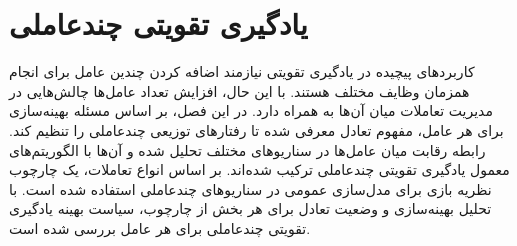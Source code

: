 \chapter{یادگیری تقویتی چندعاملی}
کاربردهای پیچیده در یادگیری تقویتی نیازمند اضافه کردن چندین عامل برای انجام همزمان وظایف مختلف هستند.
با این حال، افزایش تعداد عامل‌ها چالش‌هایی در مدیریت تعاملات میان آن‌ها به همراه دارد.
در این فصل، بر اساس مسئله بهینه‌سازی برای هر عامل، مفهوم تعادل معرفی شده تا رفتارهای توزیعی چندعاملی را تنظیم کند.
رابطه رقابت میان عامل‌ها در سناریوهای مختلف تحلیل شده و آن‌ها با الگوریتم‌های معمول یادگیری تقویتی چندعاملی ترکیب شده‌اند. بر اساس انواع تعاملات، یک چارچوب نظریه بازی برای مدل‌سازی عمومی در سناریوهای چندعاملی استفاده شده است. با تحلیل بهینه‌سازی و وضعیت تعادل برای هر بخش از چارچوب، سیاست بهینه یادگیری تقویتی چندعاملی برای هر عامل بررسی شده است.




  
    
    
    
    
    
    
     
%    
%    
